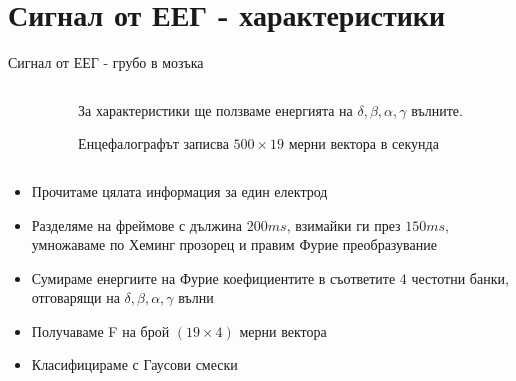\documentclass[9pt]{beamer}
\begin{document}
    \section{Сигнал от ЕЕГ - характеристики}
    \begin{frame}[t]{Сигнал от ЕЕГ - грубо в мозъка}
        \begin{columns}
            \begin{column}{0.48\textwidth}
            \end{column}
            \begin{column}{0.48\textwidth}
                За характеристики ще ползваме енергията на  $\delta, \beta, \alpha, \gamma$ вълните.

                Енцефалографът записва $500\times19$ мерни вектора в секунда
            \end{column}
        \end{columns}
        \begin{itemize}
            \setlength\itemsep{\fill}
            \pause
            \item Прочитаме цялата информация за един електрод
            \pause
            \item Разделяме на фреймове с дължина $200ms$, взимайки ги през $150ms$, умножаваме по Хеминг прозорец и правим Фурие преобразувание
            \pause
            \item Сумираме енергиите на Фурие коефициентите в съответите 4 честотни банки, отговарящи на $\delta, \beta, \alpha, \gamma$ вълни
            \pause
            \item Получаваме F на брой $(19\times 4)$ мерни вектора
            \pause
            \item Класифицираме с Гаусови смески
        \end{itemize}
    \end{frame}
\end{document}
